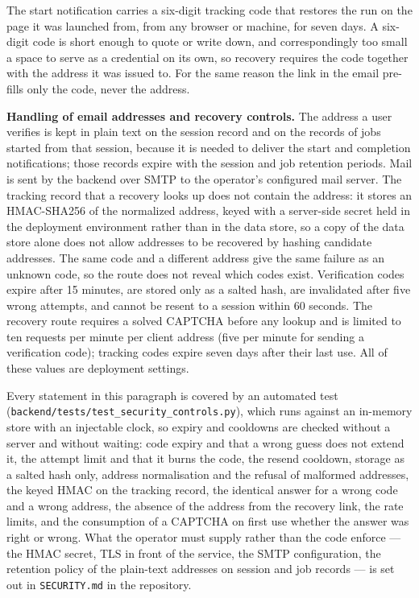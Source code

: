 \documentclass[11pt]{article}
\begin{document}
The start notification carries a six-digit tracking code that restores the run
on the page it was launched from, from any browser or machine, for seven days.
A six-digit code is short enough to quote or write down, and correspondingly
too small a space to serve as a credential on its own, so recovery requires the
code together with the address it was issued to. For the same reason the link
in the email pre-fills only the code, never the address.

\textbf{Handling of email addresses and recovery controls.} The address a user
verifies is kept in plain text on the session record and on the records of
jobs started from that session, because it is needed to deliver the start and
completion notifications; those records expire with the session and job
retention periods. Mail is sent by the backend over SMTP to the operator's
configured mail server. The tracking record that a recovery looks up does not
contain the address: it stores an HMAC-SHA256 of the normalized address, keyed
with a server-side secret held in the deployment environment rather than in the
data store, so a copy of the data store alone does not allow addresses to be
recovered by hashing candidate addresses. The same code and a different address
give the same failure as an unknown code, so the route does not reveal which
codes exist. Verification codes expire after 15 minutes, are stored only as a
salted hash, are invalidated after five wrong attempts, and cannot be resent to
a session within 60 seconds. The recovery route requires a solved CAPTCHA before
any lookup and is limited to ten requests per minute per client address (five
per minute for sending a verification code); tracking codes expire seven days
after their last use. All of these values are deployment settings.

Every statement in this paragraph is covered by an automated test
(\texttt{backend/tests/test\_security\_controls.py}), which runs against
an in-memory store with an injectable clock, so expiry and cooldowns are
checked without a server and without waiting: code expiry and that a wrong
guess does not extend it, the attempt limit and that it burns the code, the
resend cooldown, storage as a salted hash only, address normalisation and the
refusal of malformed addresses, the keyed HMAC on the tracking record, the
identical answer for a wrong code and a wrong address, the absence of the
address from the recovery link, the rate limits, and the consumption of a
CAPTCHA on first use whether the answer was right or wrong. What the operator
must supply rather than the code enforce --- the HMAC secret, TLS in front of
the service, the SMTP configuration, the retention policy of the plain-text
addresses on session and job records --- is set out in \texttt{SECURITY.md} in
the repository.
\end{document}
